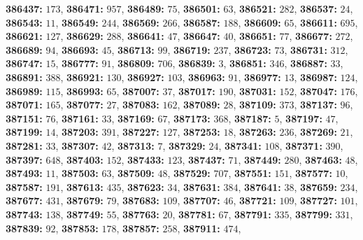 \textsf{\bfseries 386437:} $173$, \textsf{\bfseries 386471:} $957$, \textsf{\bfseries 386489:} $75$, \textsf{\bfseries 386501:} $63$, \textsf{\bfseries 386521:} $282$, \textsf{\bfseries 386537:} $24$, \textsf{\bfseries 386543:} $11$, \textsf{\bfseries 386549:} $244$, \textsf{\bfseries 386569:} $266$, \textsf{\bfseries 386587:} $188$, \textsf{\bfseries 386609:} $65$, \textsf{\bfseries 386611:} $695$, \textsf{\bfseries 386621:} $127$, \textsf{\bfseries 386629:} $288$, \textsf{\bfseries 386641:} $47$, \textsf{\bfseries 386647:} $40$, \textsf{\bfseries 386651:} $77$, \textsf{\bfseries 386677:} $272$, \textsf{\bfseries 386689:} $94$, \textsf{\bfseries 386693:} $45$, \textsf{\bfseries 386713:} $99$, \textsf{\bfseries 386719:} $237$, \textsf{\bfseries 386723:} $73$, \textsf{\bfseries 386731:} $312$, \textsf{\bfseries 386747:} $15$, \textsf{\bfseries 386777:} $91$, \textsf{\bfseries 386809:} $706$, \textsf{\bfseries 386839:} $3$, \textsf{\bfseries 386851:} $346$, \textsf{\bfseries 386887:} $33$, \textsf{\bfseries 386891:} $388$, \textsf{\bfseries 386921:} $130$, \textsf{\bfseries 386927:} $103$, \textsf{\bfseries 386963:} $91$, \textsf{\bfseries 386977:} $13$, \textsf{\bfseries 386987:} $124$, \textsf{\bfseries 386989:} $115$, \textsf{\bfseries 386993:} $65$, \textsf{\bfseries 387007:} $37$, \textsf{\bfseries 387017:} $190$, \textsf{\bfseries 387031:} $152$, \textsf{\bfseries 387047:} $176$, \textsf{\bfseries 387071:} $165$, \textsf{\bfseries 387077:} $27$, \textsf{\bfseries 387083:} $162$, \textsf{\bfseries 387089:} $28$, \textsf{\bfseries 387109:} $373$, \textsf{\bfseries 387137:} $96$, \textsf{\bfseries 387151:} $76$, \textsf{\bfseries 387161:} $33$, \textsf{\bfseries 387169:} $67$, \textsf{\bfseries 387173:} $368$, \textsf{\bfseries 387187:} $5$, \textsf{\bfseries 387197:} $47$, \textsf{\bfseries 387199:} $14$, \textsf{\bfseries 387203:} $391$, \textsf{\bfseries 387227:} $127$, \textsf{\bfseries 387253:} $18$, \textsf{\bfseries 387263:} $236$, \textsf{\bfseries 387269:} $21$, \textsf{\bfseries 387281:} $33$, \textsf{\bfseries 387307:} $42$, \textsf{\bfseries 387313:} $7$, \textsf{\bfseries 387329:} $24$, \textsf{\bfseries 387341:} $108$, \textsf{\bfseries 387371:} $390$, \textsf{\bfseries 387397:} $648$, \textsf{\bfseries 387403:} $152$, \textsf{\bfseries 387433:} $123$, \textsf{\bfseries 387437:} $71$, \textsf{\bfseries 387449:} $280$, \textsf{\bfseries 387463:} $48$, \textsf{\bfseries 387493:} $11$, \textsf{\bfseries 387503:} $63$, \textsf{\bfseries 387509:} $48$, \textsf{\bfseries 387529:} $707$, \textsf{\bfseries 387551:} $151$, \textsf{\bfseries 387577:} $10$, \textsf{\bfseries 387587:} $191$, \textsf{\bfseries 387613:} $435$, \textsf{\bfseries 387623:} $34$, \textsf{\bfseries 387631:} $384$, \textsf{\bfseries 387641:} $38$, \textsf{\bfseries 387659:} $234$, \textsf{\bfseries 387677:} $431$, \textsf{\bfseries 387679:} $79$, \textsf{\bfseries 387683:} $109$, \textsf{\bfseries 387707:} $46$, \textsf{\bfseries 387721:} $109$, \textsf{\bfseries 387727:} $101$, \textsf{\bfseries 387743:} $138$, \textsf{\bfseries 387749:} $55$, \textsf{\bfseries 387763:} $20$, \textsf{\bfseries 387781:} $67$, \textsf{\bfseries 387791:} $335$, \textsf{\bfseries 387799:} $331$, \textsf{\bfseries 387839:} $92$, \textsf{\bfseries 387853:} $178$, \textsf{\bfseries 387857:} $258$, \textsf{\bfseries 387911:} $474$, 

